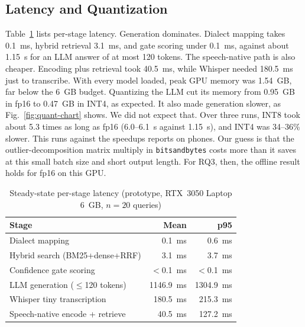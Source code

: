 \documentclass[conference]{IEEEtran}
\begin{document}
\subsection{Latency and Quantization}
Table~\ref{tab:latency} lists per-stage latency. Generation dominates. Dialect mapping takes 0.1~ms, hybrid retrieval 3.1~ms, and gate scoring under 0.1~ms, against about 1.15~s for an LLM answer of at most 120 tokens. The speech-native path is also cheaper. Encoding plus retrieval took 40.5~ms, while Whisper needed 180.5~ms just to transcribe. With every model loaded, peak GPU memory was 1.54~GB, far below the 6~GB budget. Quantizing the LLM cut its memory from 0.95~GB in fp16 to 0.47~GB in INT4, as expected. It also made generation slower, as Fig.~\ref{fig:quant-chart} shows. We did not expect that. Over three runs, INT8 took about 5.3 times as long as fp16 (6.0--6.1~s against 1.15~s), and INT4 was 34--36\% slower. This runs against the speedups \cite{compactllm2026} reports on phones. Our guess is that the outlier-decomposition matrix multiply in \texttt{bitsandbytes} costs more than it saves at this small batch size and short output length. For RQ3, then, the offline result holds for fp16 on this GPU.

\begin{table}[t]
\caption{Steady-state per-stage latency (prototype, RTX~3050 Laptop 6~GB, $n{=}20$ queries)}
\centering
\footnotesize
\begin{tabular}{@{}lrr@{}}
\toprule
\textbf{Stage} & \textbf{Mean} & \textbf{p95} \\
\midrule
Dialect mapping                    & 0.1~ms    & 0.6~ms \\
Hybrid search (BM25+dense+RRF)     & 3.1~ms    & 3.7~ms \\
Confidence gate scoring            & $<$0.1~ms & $<$0.1~ms \\
LLM generation ($\le$120 tokens)   & 1146.9~ms & 1304.9~ms \\
\midrule
Whisper tiny transcription         & 180.5~ms  & 215.3~ms \\
Speech-native encode + retrieve    & 40.5~ms   & 127.2~ms \\
\bottomrule
\end{tabular}
\label{tab:latency}
\end{table}
\end{document}
